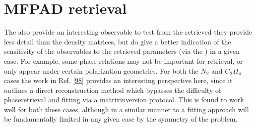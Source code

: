 \documentclass[letterpaper,table,10pt,english]{jupyterBook}
\begin{document}
\section{MF\sphinxhyphen{}PAD retrieval}
\label{\detokenize{part2/case-study-summaries_240723:mf-pad-retrieval}}
\sphinxAtStartPar
The {\hyperref[\detokenize{backmatter/glossary:term-MF}]{}} also provide an interesting observable to test from the retrieved {\hyperref[\detokenize{backmatter/glossary:term-radial-matrix-elements}]{}} \sphinxhyphen{} they provide less detail than the density matrices, but do give a better indication of the sensitivity of the observables to the retrieved parameters (via the {\hyperref[\detokenize{backmatter/glossary:term-channel-functions}]{}}) in a given case. For example, some phase relations may not be important for {\hyperref[\detokenize{backmatter/glossary:term-MF}]{}} retrieval, or only appear under certain polarization geometries. For both the \(N_2\) and \(C_2H_4\) cases the work in Ref. {[}\hyperlink{cite.backmatter/bibliography:id636}{98}{]} provides an interesting perspective here, since it outlines a direct {\hyperref[\detokenize{backmatter/glossary:term-MF}]{}} reconstruction method which bypasses the difficulty of phase\sphinxhyphen{}retrieval and fitting via a matrix\sphinxhyphen{}inversion protocol. This is found to work well for both these cases, although in a similar manner to a fitting approach will be fundamentally limited in any given case by the symmetry of the problem.
\end{document}
